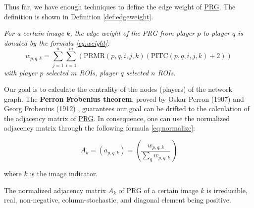 Thus far, we have enough techniques to define the edge weight of \hyperref[idx:prg]{PRG}.
The definition is shown in Definition \ref{def:edgeweight}.

\begin{definition}
\label{def:edgeweight}
\emph{
For a certain image $k$, the edge weight of the PRG from player $p$ to player $q$ is donated 
by the formula \ref{eq:weight}:
\begin{equation}
\label{eq:weight}
w_{p,q,k} = 
\sum_{j=1}^{n}{
\sum_{i=1}^{m}{ \left(
  \text{PRMR}(p, q, i, j, k)
  \left(
    \text{PITC}(p, q, i, j, k) + 2
  \right)
\right)}}
\end{equation}
with player $p$ selected $m$ ROIs, player $q$ selected $n$ ROIs.
}
\end{definition}

Our goal is to calculate the centrality of the nodes (players) of the network graph.
The \textbf{Perron Frobenius theorem}, proved by Oskar Perron (1907) \cite{perron1907theorie} and Georg Frobenius (1912) \cite{frobenius1912matrizen},
guarantees our goal can be drifted to the calculation of the adjacency matrix of \hyperref[idx:prg]{PRG}.
In consequence, one can use the normalized adjacency matrix through the following formula \ref{eq:normalize}:

\begin{equation}
\label{eq:normalize}
A_k = (a_{p,q,k}) = (\frac{w_{p,q,k}}{\sum_{q}{w_{p,q,k}}})
\end{equation}

where $k$ is the image indicator.

\begin{theorem}
\label{theorem:property}
The normalized adjacency matrix $A_k$ of PRG of a certain image $k$ is irreducible, real, 
non-negative, column-stochastic, and diagonal element being positive.
\end{theorem}

